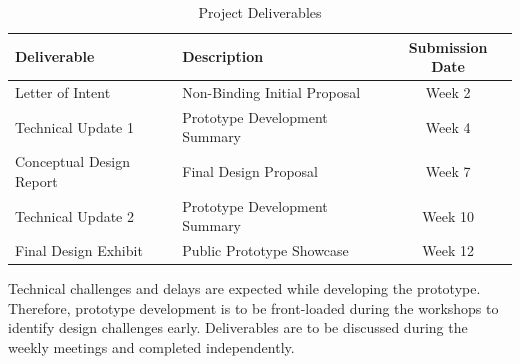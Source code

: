 \documentclass[letterpaper,fleqn,oneside]{template}
\begin{document}
\begin{table}[htbp]
  \caption{Project Deliverables}
  \begin{center}
    \begin{tabular}{llc}
      \toprule
      \bf Deliverable & \bf Description & \bf Submission Date \\ \midrule
      Letter of Intent & Non-Binding Initial Proposal & Week 2 \\
      Technical Update 1 & Prototype Development Summary & Week 4 \\
      Conceptual Design Report & Final Design Proposal & Week 7 \\
      Technical Update 2 & Prototype Development Summary & Week 10 \\
      Final Design Exhibit & Public Prototype Showcase & Week 12 \\
      \bottomrule
    \end{tabular}
  \end{center}
  \label{tbl:deliverables}
\end{table}%

Technical challenges and delays are expected while developing the prototype. Therefore, prototype development is to be front-loaded during the workshops to identify design challenges early. Deliverables are to be discussed during the weekly meetings and completed independently. 


\end{document}

